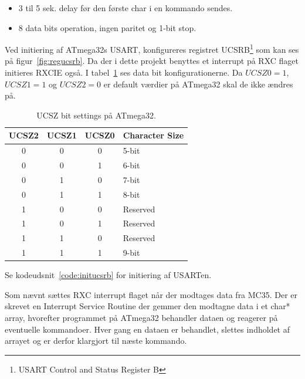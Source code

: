 \begin{itemize}
	\item 3 til 5 sek. delay før den første char i en kommando sendes.
	\item 8 data bits operation, ingen paritet og 1-bit stop.
\end{itemize}

Ved initiering af ATmega32s USART, konfigureres registret UCSRB\footnote{USART Control and Status Register B} 
som kan ses på figur~\ref{fig:regucsrb}. Da der i dette projekt benyttes et interrupt på RXC flaget initieres RXCIE også.
I tabel~\ref{fig:ucszbitsettings} ses data bit konfigurationerne. Da $UCSZ0=1$, $UCSZ1=1$ og $UCSZ2=0$ er default værdier på 
ATmega32 skal de ikke ændres på.


\begin{table}[h]
	\centering
	\begin{tabular}{|c|c|c|l|}
		\hline
		\rowcolor[HTML]{EFEFEF} 
		\textbf{UCSZ2} & \textbf{UCSZ1} & \textbf{UCSZ0} & \textbf{Character Size} \\ \hline
		0 & 0 & 0 & 5-bit \\ \hline
		0 & 0 & 1 & 6-bit \\ \hline
		0 & 1 & 0 & 7-bit \\ \hline
		0 & 1 & 1 & 8-bit \\ \hline
		1 & 0 & 0 & Reserved \\ \hline
		1 & 0 & 1 & Reserved \\ \hline
		1 & 1 & 0 & Reserved \\ \hline
		1 & 1 & 1 & 9-bit \\ \hline
	\end{tabular}
	\caption{UCSZ bit settings på ATmega32.}
	\label{fig:ucszbitsettings}
\end{table}

Se kodeudsnit~\ref{code:initucsrb} for initiering af USARTen. 

Som nævnt sættes RXC interrupt flaget når der modtages data fra MC35.
Der er skrevet en Interrupt Service Routine der gemmer den modtagne data i et char* array, hvorefter programmet på ATmega32 behandler dataen
og reagerer på eventuelle kommandoer. Hver gang en dataen er behandlet, slettes indholdet af arrayet og er derfor klargjort til næste 
kommando. 

